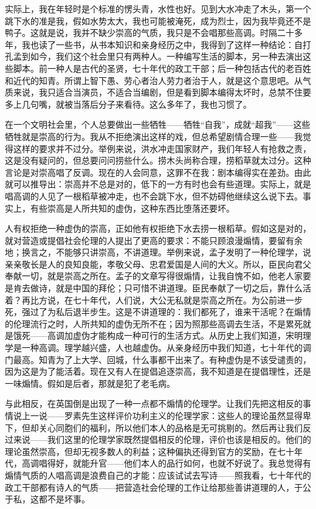 实际上，我在年轻时是个标准的愣头青，水性也好。见到大水冲走了木头，第一个跳下水的准是我，假如水势太大，我也可能被淹死，成为烈士，因为我毕竟还不是鸭子。这就是说，我并不缺少崇高的气质，我只是不会唱那些高调。时隔二十多年，我也读了一些书，从书本知识和亲身经历之中，我得到了这样一种结论：自打孔孟到如今，我们这个社会里只有两种人。一种编写生活的脚本，另一种去演出这些脚本。前一种人是古代的圣贤，七十年代的政工干部；后一种包括古代的老百姓和近代的知青。所谓上智下愚、劳心者治人劳力者治于人，就是这个意思吧。从气质来说，我只适合当演员，不适合当编剧，但是看到脚本编得太坏时，总禁不住要多上几句嘴，就被当落后分子来看待。这么多年了，我也习惯了。　 

在一个文明社会里，个人总要做出一些牺牲——牺牲“自我”，成就“超我”——这些牺牲就是崇高的行为。我从不拒绝演出这样的戏，但总希望剧情合理一些——我觉得这样的要求并不过分。举例来说，洪水冲走国家财产，我们年轻人有抢救之责，这是没有疑问的，但总要问问捞些什么。捞木头尚称合理，捞稻草就太过分。这种言论是对崇高唱了反调。现在的人会同意，这罪不在我：剧本编得实在差劲。由此就可以推导出：崇高并不总是对的，低下的一方有时也会有些道理。实际上，就是唱高调的人见了一根稻草被冲走，也不会跳下水，但不妨碍他继续这么说下去。事实上，有些崇高是人所共知的虚伪，这种东西比堕落还要坏。　 

人有权拒绝一种虚伪的崇高，正如他有权拒绝下水去捞一根稻草。假如这是对的，就对营造或提倡社会伦理的人提出了更高的要求：不能只顾浪漫煽情，要留有余地；换言之，不能够只讲崇高，不讲道理。举例来说，孟子发明了一种伦理学，说亲亲敬长是人的良知良能，孝敬父母、忠君爱国是人间的大义。所以，臣民向君父奉献一切，就是崇高之所在。孟子的文章写得很煽情，让我自愧不如，他老人家要是肯去做诗，就是中国的拜伦；只可惜不讲道理。臣民奉献了一切之后，靠什么活着？再比方说，在七十年代，人们说，大公无私就是崇高之所在。为公前进一步死，强过了为私后退半步生。这是不讲道理的：我们都死了，谁来干活呢？在煽情的伦理流行之时，人所共知的虚伪无所不在；因为照那些高调去生活，不是累死就是饿死——高调加虚伪才能构成一种可行的生活方式。从历史上我们知道，宋明理学是一种高调。理学越兴盛，人也越虚伪。从亲身经历中我们知道，七十年代的调门最高。知青为了上大学、回城，什么事都干出来了。有种虚伪是不该受谴责的，因为这是为了能活着。现在又有人在提倡追逐崇高，我不知道是在提倡理性，还是一味煽情。假如是后者，那就是犯了老毛病。　 

与此相反，在英国倒是出现了一种一点都不煽情的伦理学。让我们先把这相反的事情说上一说——罗素先生这样评价功利主义的伦理学家：这些人的理论虽然显得卑下，但却关心同胞们的福利，所以他们本人的品格是无可挑剔的。然后再让我们反过来说——我们这里的伦理学家既然提倡相反的伦理，评价也该是相反的。他们的理论虽然崇高，但却无视多数人的利益；这种偏执还得到官方的奖励，在七十年代，高调唱得好，就能升官——他们本人的品行如何，也就不好说了。我总觉得有煽情气质的人唱高调是浪费自己的才能：应该试试去写诗——照我看，七十年代的政工干部都有诗人的气质——把营造社会伦理的工作让给那些善讲道理的人，于公于私，这都不是坏事。　

